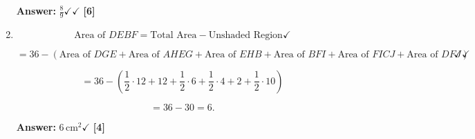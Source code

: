 \documentclass[12pt]{article}
\begin{document}
\begin{enumerate}[topsep=2\bigskipamount,itemsep=\bigskipamount]
\textbf{Answer:} $\frac{8}{9} \checkmark \checkmark$ \textbf{[6]}

\item \[
\text{Area of } DEBF = \text{Total Area} - \text{Unshaded Region} \checkmark
\]

\[
= 36 - (\text{Area of } DGE + \text{Area of } AHEG + \text{Area of } EHB + \text{Area of } BF I + \text{Area of } F ICJ + \text{Area of } DF J) \checkmark \checkmark
\]

\[
= 36 - \left(
\frac{1}{2} \cdot 12 + 12 + 
\frac{1}{2} \cdot 6 + 
\frac{1}{2} \cdot 4 + 2 + 
\frac{1}{2} \cdot 10
\right) 
\]

\[
= 36 - 30 = 6.
\]

\textbf{Answer:} $6 \, \text{cm}^2 \checkmark$ \textbf{[4]}


\end{enumerate}
\end{document}
